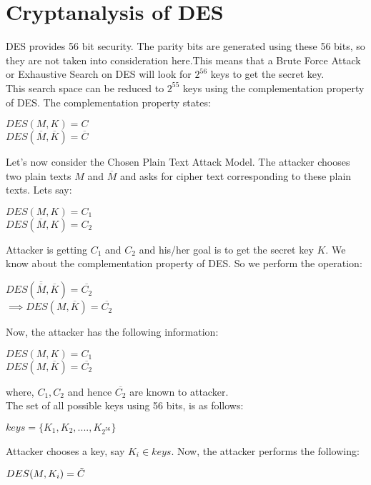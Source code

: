 \documentclass[11pt]{article}
\begin{document}
\section{Cryptanalysis of DES}
DES provides 56 bit security. The parity bits are generated using these 56 bits, so they are not taken into consideration here.This means that a Brute Force Attack or Exhaustive Search on DES will look for $2^{56}$ keys to get the secret key.\\
This search space can be reduced to $2^{55}$ keys using the complementation property of DES.
\vspace{3mm}
The complementation property states:
\begin{center}
    $DES(M, K) = C$\\
    $DES(\overline{M}, \overline{K}) = \overline{C}$
\end{center}
Let's now consider the Chosen Plain Text Attack Model. The attacker chooses two plain texts $M$ and $\overline{M}$ and asks for cipher text corresponding to these plain texts. Lets say:
\begin{center}
    $DES(M, K) = C_1$\\
    $DES(\overline{M}, K) = C_2$
\end{center}
Attacker is getting $C_1$ and $C_2$ and his/her goal is to get the secret key $K$. 
\vspace{3mm}
We know about the complementation property of DES. So we perform the operation:
\begin{center}
    $DES(\overline{\overline{M}}, \overline{K}) = \overline{C_2}$\\
    \vspace{1mm}
    $\implies DES(M, \overline{K}) = \overline{C_2}$
\end{center}
Now, the attacker has the following information:
\begin{center}
    $DES(M, K) = C_1$\\
    \vspace{1mm}
    $DES(M, \overline{K}) = \overline{C_2}$
\end{center}
where, $C_1, C_2$ and hence $\overline{C_2}$ are known to attacker. \\
The set of all possible keys using 56 bits, is as follows:
\begin{center}
    $keys = \{K_1, K_2,...., K_{2^{56}}\}$
\end{center}
Attacker chooses a key, say $K_i \in keys$. Now, the attacker performs the following:
\begin{center}
    $DES(M, K_i) = \Tilde{C}$
\end{center}
\end{document}
